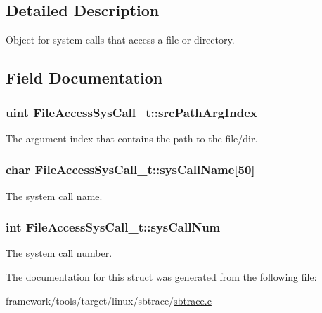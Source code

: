 \subsection{Detailed Description}
Object for system calls that access a file or directory. 

\subsection{Field Documentation}
\subsubsection[{\texorpdfstring{src\+Path\+Arg\+Index}{srcPathArgIndex}}]{\setlength{\rightskip}{0pt plus 5cm}uint File\+Access\+Sys\+Call\+\_\+t\+::src\+Path\+Arg\+Index}\hypertarget{struct_file_access_sys_call__t_a369352cb21edd042835678d86a903153}{}\label{struct_file_access_sys_call__t_a369352cb21edd042835678d86a903153}


The argument index that contains the path to the file/dir. 

\subsubsection[{\texorpdfstring{sys\+Call\+Name}{sysCallName}}]{\setlength{\rightskip}{0pt plus 5cm}char File\+Access\+Sys\+Call\+\_\+t\+::sys\+Call\+Name\mbox{[}50\mbox{]}}\hypertarget{struct_file_access_sys_call__t_a6d42ef87418c0fb89d51511e8b7494b4}{}\label{struct_file_access_sys_call__t_a6d42ef87418c0fb89d51511e8b7494b4}


The system call name. 

\subsubsection[{\texorpdfstring{sys\+Call\+Num}{sysCallNum}}]{\setlength{\rightskip}{0pt plus 5cm}int File\+Access\+Sys\+Call\+\_\+t\+::sys\+Call\+Num}\hypertarget{struct_file_access_sys_call__t_aac77377eb1268f38928c6c10a863108c}{}\label{struct_file_access_sys_call__t_aac77377eb1268f38928c6c10a863108c}


The system call number. 



The documentation for this struct was generated from the following file\+:\begin{DoxyCompactItemize}
\item 
framework/tools/target/linux/sbtrace/\hyperlink{sbtrace_8c}{sbtrace.\+c}\end{DoxyCompactItemize}

